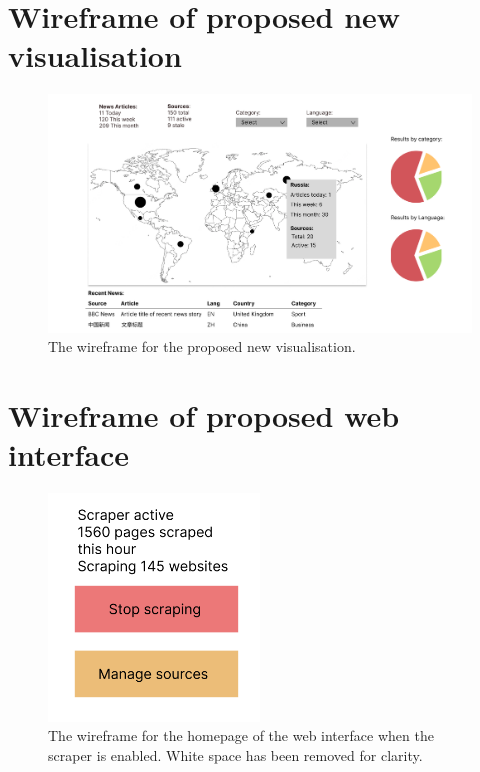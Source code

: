 \documentclass{l4proj}
\begin{document}
\begin{appendices}
\chapter{Wireframe of proposed new visualisation}
\label{appendix:visualisation-wireframe}
 \begin{figure}[h]
\centering
\includegraphics[width=\textwidth]{images/visualisation-wireframe.png}
\caption{The wireframe for the proposed new visualisation.}
\label{fig:visualisation-wireframe}
\end{figure}


\chapter{Wireframe of proposed web interface}
\label{appendix:interface-wireframe}

 \begin{figure}[h]
\centering
\includegraphics[width=0.5\textwidth]{images/wireframe-home-1.png}
\caption{The wireframe for the homepage of the web interface when the scraper is enabled. White space has been removed for clarity.}
\label{fig:interface-wireframe}
\end{figure}


\end{appendices}
\end{document}
